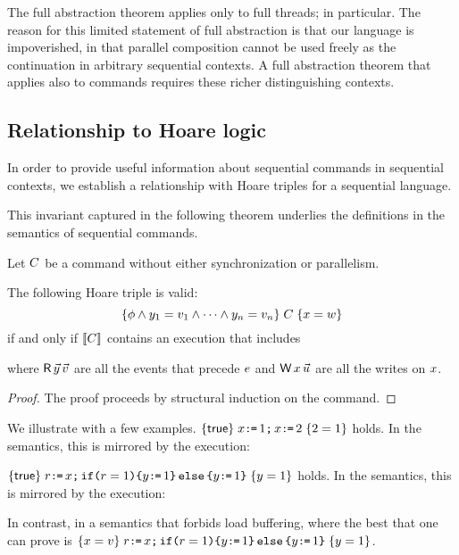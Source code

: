 The full abstraction theorem applies only to full threads; in particular.  The reason for this limited statement of full abstraction is that our language is impoverished, in that parallel composition cannot be used freely as the continuation in arbitrary sequential contexts.  A full abstraction theorem that applies also to commands requires these richer distinguishing contexts.  


\subsection{Relationship to Hoare logic}
In order to provide useful information about sequential commands in sequential contexts, we establish a relationship with Hoare triples for a sequential language.    

This invariant captured in the following theorem underlies the definitions in the semantics of sequential commands.
\begin{theorem}
Let $C$ be a command without either synchronization or parallelism.

The following Hoare triple is valid:
\begin{displaymath}
  \{\phi\land y_1=v_1\land\cdots\land y_n=v_n\}\;C\;\{x=w\}  
\end{displaymath}
if and only if $\llbracket C\rrbracket$ contains an execution that includes
\begin{tikzdisplay}[node distance=1em]
\end{tikzdisplay}
where $\DR{\vec{\bLoc}}{\vec{\aVal}}$ are all the events that precede $e$ and
$\DW{\aLoc}{\vec{\dVal}}$ are all the writes on $x$.
\begin{proof}
The proof proceeds by structural induction on the command. 
\end{proof}
\end{theorem}

We illustrate with a few examples.
$\{\mathsf{true}\}\;x\texttt{:}\mkern-1mu\texttt{=}\, 1 \texttt{;}\, x \texttt{:}\mkern-1mu\texttt{=}\, 2\;\{2=1\} $ holds.   In the semantics, this is mirrored by the execution:
\begin{tikzdisplay}[node distance=1em]
\end{tikzdisplay}

$\{\mathsf{true}\}\;r \texttt{:}\mkern-1mu\texttt{=}\, x \texttt{;}\, \texttt{if}\allowbreak\texttt{(}r=1\texttt{)} \allowbreak\texttt{\{} y \texttt{:}\mkern-1mu\texttt{=}\, 1 \texttt{\}}\,\allowbreak\texttt{else}\allowbreak\,\texttt{\{} y \texttt{:}\mkern-1mu\texttt{=}\, 1 \texttt{\}}\;\{y=1\} $ holds.  
In the semantics, this is mirrored by the execution:
\begin{tikzdisplay}[node distance=1em]
\end{tikzdisplay}
In contrast, in a semantics that forbids load buffering, where the best that one can prove is
$\{x=v\}\;r \texttt{:}\mkern-1mu\texttt{=}\, x \texttt{;}\, \texttt{if}\allowbreak\texttt{(}r=1\texttt{)} \allowbreak\texttt{\{} y \texttt{:}\mkern-1mu\texttt{=}\, 1 \texttt{\}}\,\allowbreak\texttt{else}\allowbreak\,\texttt{\{} y \texttt{:}\mkern-1mu\texttt{=}\, 1 \texttt{\}}\;\{y= 1\}
$.

